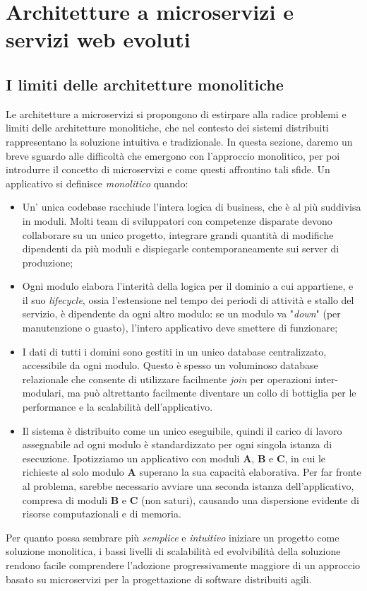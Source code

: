 \chapter{Architetture a microservizi e servizi web evoluti}
\section{I limiti delle architetture monolitiche}
Le architetture a microservizi si propongono di estirpare alla radice problemi e limiti delle architetture monolitiche, che nel contesto dei sistemi distribuiti rappresentano la soluzione intuitiva e tradizionale. In questa sezione, daremo un breve sguardo alle difficoltà che emergono con l'approccio monolitico, per poi introdurre il concetto di microservizi e come questi affrontino tali sfide.
Un applicativo si definisce \emph{monolitico} quando:

\begin{itemize}
  \item Un' unica codebase racchiude l'intera logica di business, che è al più suddivisa in moduli. Molti team di sviluppatori con competenze disparate devono collaborare su un unico progetto, integrare grandi quantità di modifiche dipendenti da più moduli e dispiegarle contemporaneamente sui server di produzione;
  \item Ogni modulo elabora l'interità della logica per il dominio a cui appartiene, e il suo \emph{lifecycle}, ossia l'estensione nel tempo dei periodi di attività e stallo del servizio, è dipendente da ogni altro modulo: se un modulo va "\emph{down}" (per manutenzione o guasto), l'intero applicativo deve smettere di funzionare;
  \item I dati di tutti i domini sono gestiti in un unico database centralizzato, accessibile da ogni modulo. Questo è spesso un voluminoso database relazionale che consente di utilizzare facilmente \emph{join} per operazioni inter-modulari, ma può altrettanto facilmente diventare un collo di bottiglia per le performance e la scalabilità dell'applicativo.
  \item Il sistema è distribuito come un unico eseguibile, quindi il carico di lavoro assegnabile ad ogni modulo è standardizzato per ogni singola istanza di esecuzione.
  Ipotizziamo un applicativo con moduli \textbf{A}, \textbf{B} e \textbf{C}, in cui le richieste al solo modulo \textbf{A} superano la sua capacità elaborativa. Per far fronte al problema, sarebbe necessario avviare una seconda istanza dell'applicativo, compresa di moduli \textbf{B} e \textbf{C} (non saturi), causando una dispersione evidente di risorse computazionali e di memoria.
\end{itemize}
Per quanto possa sembrare più \emph{semplice} e \emph{intuitivo} iniziare un progetto come soluzione monolitica, i bassi livelli di scalabilità ed evolvibilità della soluzione rendono facile comprendere l'adozione progressivamente maggiore di un approccio basato su microservizi per la progettazione di software distribuiti agili.

